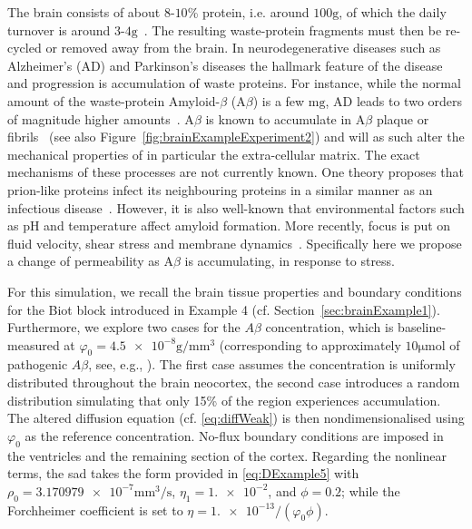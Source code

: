 \documentclass[fleqn,a4paper]{cas-sc}
\newcommand{\0}{\boldsymbol{0}}
\numberwithin{equation}{section}
\numberwithin{figure}{section}
\begin{document}
The brain consists of about $\num[round-mode=figures, round-precision=1]{8}$-$\num[round-mode=figures, round-precision=1]{10}$\% protein, i.e. around $\num[round-mode=figures, round-precision=1]{100} \unit{\g}$, of which the daily turnover is around $\num[round-mode=figures, round-precision=1]{3}$-$\num[round-mode=figures, round-precision=1]{4} \unit{\g}$~\cite{rasmussen2022fluid}. The resulting waste-protein fragments must then be re-cycled or removed away from the brain. In neurodegenerative diseases such as Alzheimer's (AD) and Parkinson's diseases the hallmark feature of the disease and progression is accumulation of waste proteins. For instance, while the normal amount of the waste-protein Amyloid-$\beta$ (A$\beta$) is a few {$\unit{\mg}$}, AD leads to two orders of magnitude higher amounts~\cite{bateman2006human}. A$\beta$ is known to accumulate in A$\beta$ plaque or fibrils~\cite{schmit2011drives} (see also Figure~\ref{fig:brainExampleExperiment2}) and will as such alter the mechanical properties of in particular the extra-cellular matrix. 
The exact mechanisms of these processes are not currently known. 
One theory {proposes that prion-like proteins} infect its neighbouring proteins in a similar manner as an infectious disease~\cite{weickenmeier2018multiphysics}. However, it is also well-known 
that  environmental factors such as pH and temperature
affect amyloid formation. More recently, focus is
put on fluid velocity, shear stress and membrane dynamics~\cite{iorio2025fluid, krausser2020physical, willis2025flow}. 
Specifically here we propose a change of permeability as A$\beta$ is accumulating, in response to stress. 

For this simulation, we recall the brain tissue properties and boundary conditions for the Biot block introduced in Example 4 (cf. Section~\ref{sec:brainExample1}). Furthermore, we explore two cases for the $A\beta$ concentration, which is baseline-measured at $\varphi_0 = \num[round-mode=figures, round-precision=3]{4.5e-8} \unit{\g}/\unit{\mm^3}$ (corresponding to approximately $\num[round-mode=figures, round-precision=1]{10} \unit{\micro\mol}$ of {pathogenic $A\beta$, see, e.g., \cite{Corti26}}). The first case assumes the concentration is uniformly distributed throughout the brain neocortex, the second case introduces a random distribution simulating that only 15\% of the region experiences accumulation. The altered diffusion equation (cf. \eqref{eq:diffWeak}) is then nondimensionalised using $\varphi_0$ as the reference concentration. No-flux boundary conditions are imposed in the ventricles and the remaining section of the cortex. Regarding the nonlinear terms, the \gls{sad} takes the form provided in \eqref{eq:DExample5} with $\rho_0=\num[round-mode=figures, round-precision=5]{3.170979e-7} \unit{\mm^3}/\unit{\s}$, $\eta_1=\num[round-mode=figures, round-precision=1]{1.e-2}$, and $\phi=0.2$; while the Forchheimer coefficient is set to $\eta = \num[round-mode=figures, round-precision=1]{1.e-13}/(\varphi_0 \phi)$.
\end{document}
